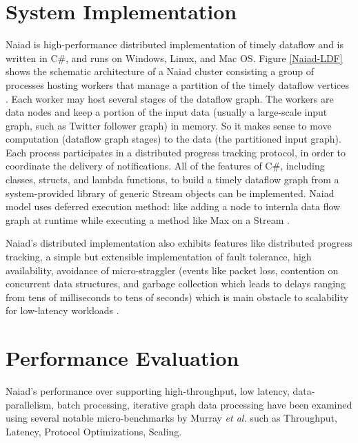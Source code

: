 \documentclass[9pt,twocolumn,twoside]{../../styles/osajnl}
\begin{document}

\section{System Implementation}
Naiad is high-performance distributed implementation of timely
dataflow and is written in C$\#$, and runs on Windows, Linux, and Mac
OS. Figure \ref{Naiad-LDF} shows the schematic architecture of a Naiad
cluster consisting a group of processes hosting workers that manage a
partition of the timely dataflow vertices \cite{paper3-Naiad}. Each
worker may host several stages of the dataflow graph. The workers are
data nodes and keep a portion of the input data (usually a large-scale
input graph, such as Twitter follower graph) in memory. So it makes
sense to move computation (dataflow graph stages) to the data (the
partitioned input
graph)\cite{www-informationage-blog-wordpress-naiad}. Each process
participates in a distributed progress tracking protocol, in order to
coordinate the delivery of notifications.  All of the features of
C$\#$, including classes, structs, and lambda functions, to build a
timely dataflow graph from a system-provided library of generic Stream
objects can be implemented. Naiad model uses deferred execution
method: like adding a node to internla data flow graph at runtime
while executing a method like Max on a Stream \cite{paper1-Naiad}.

Naiad's distributed implementation also exhibits features like
distributed progress tracking, a simple but extensible implementation
of fault tolerance, high availability, avoidance of micro-straggler
(events like packet loss, contention on concurrent data structures,
and garbage collection which leads to delays ranging from tens of
milliseconds to tens of seconds) which is main obstacle to scalability
for low-latency workloads \cite{paper1-Naiad}.

\section{Performance Evaluation}
Naiad's performance over supporting high-throughput, low latency,
data-parallelism, batch processing, iterative graph data processing
have been examined using several notable micro-benchmarks by Murray
\textit{et al.} \cite{paper1-Naiad} such as Throughput, Latency,
Protocol Optimizations, Scaling. 
\end{document}
